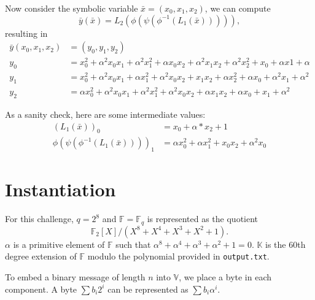 \documentclass{article}
\newcommand{\F}{\ensuremath{\mathbb{F}}}
\newcommand{\Fq}{\ensuremath{\F_q}}
\newcommand{\K}{\ensuremath{\mathbb{K}}}
\newcommand{\V}{\ensuremath{\mathbb{V}}}
\newcommand{\vv}[1]{\ensuremath{\bar{#1}}}
\begin{document}
Now consider the symbolic variable $\vv{x} = (x_0, x_1, x_2)$, we can compute \[\vv{y}(\vv{x}) = L_2(\phi(\psi(\phi^{-1}(L_1(\vv{x}))))),\] resulting in
\begin{align*}
  \vv{y}(x_0,x_1,x_2) &= (y_0,y_1,y_2)\\
  y_0 &= x_0^2 + \alpha^2 x_0 x_1 + \alpha^2 x_1^2 + \alpha x_0 x_2 + \alpha^2 x_1 x_2 + \alpha^2 x_2^2 + x_0 + \alpha x1 + \alpha\\
  y_1 &= x_0^2 + \alpha^2 x_0 x_1 + \alpha x_1^2 + \alpha^2 x_0 x_2 + x_1 x_2 + \alpha x_2^2 + \alpha x_0 + \alpha^2 x_1 + \alpha^2\\
  y_2 &= \alpha x_0^2 + \alpha^2 x_0 x_1 + \alpha^2 x_1^2 + \alpha^2 x_0 x_2 + \alpha x_1 x_2 + \alpha x_0 + x_1 + \alpha^2\end{align*}
  
As a sanity check, here are some intermediate values:
\begin{align*}
  (L_1(\vv{x}))_0 &= x_0 + \alpha*x_2 + 1 \\
  \phi(\psi(\phi^{-1}(L_1(\vv{x}))))_1 &= \alpha x_0^2 + \alpha x_1^2 + x_0 x_2 + \alpha^2 x_0
\end{align*}

\section{Instantiation}

For this challenge, $q = 2^{8}$ and $\F = \Fq$ is represented as the quotient \[\F_2[X]/(X^8 + X^4 + X^3 + X^2 + 1).\]
$\alpha$ is a primitive element of $\F$ such that $\alpha^8 + \alpha^4 + \alpha^3 + \alpha^2 + 1 = 0$.
$\K$ is the $60$th degree extension of $\F$ modulo the polynomial provided in \texttt{output.txt}.

To embed a binary message of length $n$ into $\V$, we place a byte in each component.
A byte $\sum b_i 2^i$ can be represented as $\sum b_i \alpha^i$.
\end{document}
